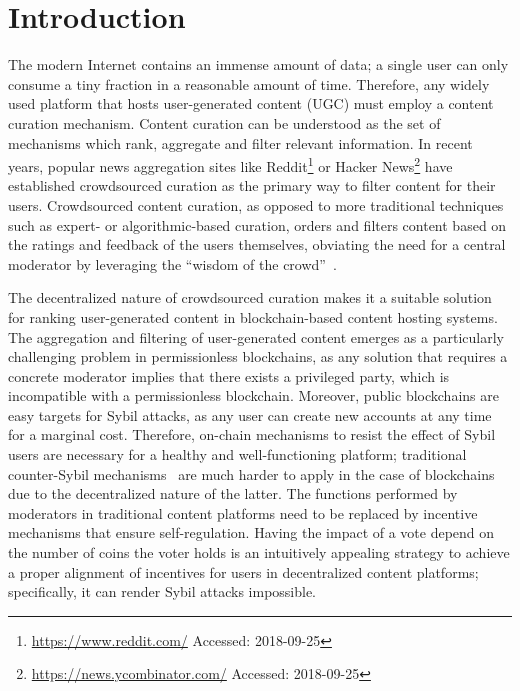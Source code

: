 \section{Introduction}
  The modern Internet contains an immense amount of data; a single user can only consume a tiny fraction in a reasonable amount of time. Therefore, any widely used platform that hosts user-generated content (UGC) must employ a content curation mechanism.
   Content curation can be understood as the set of mechanisms which rank, aggregate and filter relevant information. In recent years, popular news aggregation sites like Reddit\footnote{\url{https://www.reddit.com/} Accessed: 2018-09-25} or Hacker News\footnote{\url{https://news.ycombinator.com/} Accessed: 2018-09-25} have established crowdsourced curation as the primary way to filter content for their users.
   Crowdsourced content curation, as opposed to more traditional techniques such as expert- or algorithmic-based curation, orders and filters content based on the ratings and feedback of the users themselves, obviating the need for a central moderator by leveraging the ``wisdom of the crowd''~\cite{askalidis2013theoretical}.

  The decentralized nature of crowdsourced curation makes it a suitable solution for ranking user-generated content in blockchain-based content hosting systems. The aggregation and filtering of user-generated content emerges as a particularly challenging problem in permissionless blockchains, as any solution that requires a concrete moderator implies that there exists a privileged party, which is incompatible with a permissionless blockchain.
   Moreover, public blockchains are easy targets for Sybil attacks, as any user can create new accounts at any time for a marginal cost.
    Therefore, on-chain mechanisms to resist the effect of Sybil users are necessary for a healthy and well-functioning platform; traditional counter-Sybil mechanisms~\cite{levine2006survey} are much harder to apply in the case of blockchains due to the decentralized nature of the latter.
   The functions performed by moderators in traditional content platforms need to be replaced by incentive mechanisms that ensure self-regulation. Having the impact of a vote depend on the number of coins the voter holds is an intuitively appealing strategy to achieve a proper alignment of incentives for users in decentralized content platforms; specifically, it can render Sybil attacks impossible.

